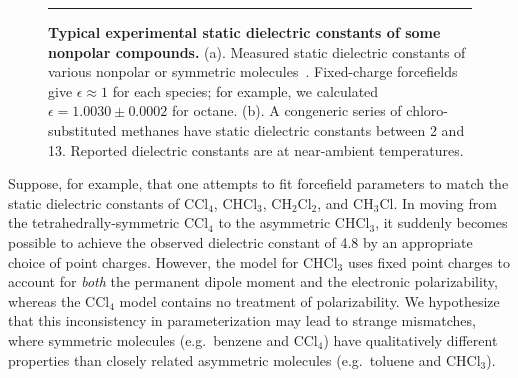 \documentclass[aip, jcp, reprint]{revtex4-1}  %
\begin{document}
\begin{figure}


\noindent\rule{8cm}{0.4pt}


\caption{{\bf Typical experimental static dielectric constants of some nonpolar compounds.}
(a). Measured static dielectric constants of various nonpolar or symmetric molecules~\cite{d1990dielectric, haynes2011crc}.  
Fixed-charge forcefields give $\epsilon \approx 1$ for each species; for example, we calculated $\epsilon = 1.0030 \pm 0.0002$ for octane.
(b).  A congeneric series of chloro-substituted methanes have static dielectric constants between 2 and 13.  
Reported dielectric constants are at near-ambient temperatures.  
}
\label{figure:nonpolars}

\end{figure}


Suppose, for example, that one attempts to fit forcefield parameters to match the static dielectric constants of $\mathrm{CCl_4}$, $\mathrm{CHCl_3}$, $\mathrm{CH_2Cl_2}$, and $\mathrm{CH_3Cl}$.
In moving from the tetrahedrally-symmetric $\mathrm{CCl_4}$ to the asymmetric $\mathrm{CHCl_3}$, it suddenly becomes possible to achieve the observed dielectric constant of 4.8 by an appropriate choice of point charges.
However, the model for $\mathrm{CHCl_3}$ uses fixed point charges to account for \emph{both} the permanent dipole moment and the electronic polarizability, whereas the $\mathrm{CCl_4}$ model contains no treatment of polarizability.  
We hypothesize that this inconsistency in parameterization may lead to strange mismatches, where symmetric molecules (e.g.~benzene and $\mathrm{CCl_4}$) have qualitatively different properties than closely related asymmetric molecules (e.g.~toluene and $\mathrm{CHCl_3}$).
\end{document}
